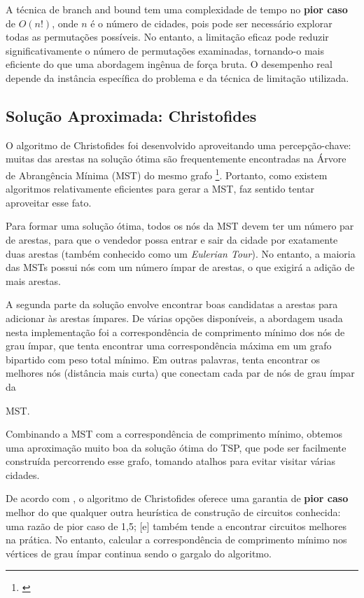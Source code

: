 A técnica de branch and bound tem uma complexidade de tempo no \textbf{pior caso} de $O(n!)$, 
onde $n$ é o número de cidades, pois pode ser necessário explorar todas as permutações possíveis. 
No entanto, a limitação eficaz pode reduzir significativamente o número de permutações examinadas, 
tornando-o mais eficiente do que uma abordagem ingênua de força bruta. O desempenho real depende da 
instância específica do problema e da técnica de limitação utilizada.

\subsection{Solução Aproximada: Christofides} \label{sec:chris_explanation}

O algoritmo de Christofides foi desenvolvido aproveitando uma percepção-chave: muitas das arestas na 
solução ótima são frequentemente encontradas na Árvore de Abrangência Mínima (MST) do mesmo grafo 
\footnote{\cite{reducible_explanation}}. Portanto, como existem algoritmos relativamente eficientes 
para gerar a MST, faz sentido tentar aproveitar esse fato.

Para formar uma solução ótima, todos os nós da MST devem ter um número par de arestas, para que 
o vendedor possa entrar e sair da cidade por exatamente duas arestas (também conhecido como um 
\textit{Eulerian Tour}). No entanto, a maioria das MSTs possui nós com um número ímpar de arestas, 
o que exigirá a adição de mais arestas.

A segunda parte da solução envolve encontrar boas candidatas a arestas para adicionar às arestas 
ímpares. De várias opções disponíveis, a abordagem usada nesta implementação foi a correspondência 
de comprimento mínimo dos nós de grau ímpar, que tenta encontrar uma correspondência máxima em um grafo 
bipartido com peso total mínimo. Em outras palavras, tenta encontrar os melhores nós (distância mais curta) 
que conectam cada par de nós de grau ímpar da

 MST.

Combinando a MST com a correspondência de comprimento mínimo, obtemos uma aproximação muito boa 
da solução ótima do TSP, que pode ser facilmente construída percorrendo esse grafo, tomando atalhos 
para evitar visitar várias cidades.

De acordo com \cite{Johnson2003}, o algoritmo de Christofides oferece uma garantia de \textbf{pior caso} melhor 
do que qualquer outra heurística de construção de circuitos conhecida: uma razão de pior caso de 1,5; 
[e] também tende a encontrar circuitos melhores na prática. No entanto, calcular a correspondência 
de comprimento mínimo nos vértices de grau ímpar continua sendo o gargalo do algoritmo.

